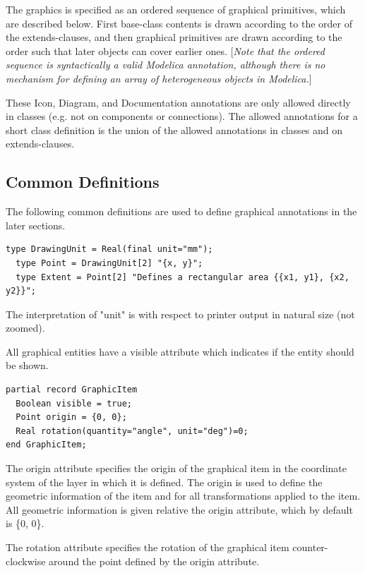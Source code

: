 \documentclass[10pt,a4paper]{report}
\def\doublelabel#1{\label{#1}}
\begin{document}
The graphics is specified as an ordered sequence of graphical
primitives, which are described below. First base-class contents is
drawn according to the order of the extends-clauses, and then graphical
primitives are drawn according to the order such that later objects can
cover earlier ones. {[}\emph{Note that the ordered sequence is
syntactically a valid Modelica annotation, although there is no
mechanism for defining an array of heterogeneous objects in
Modelica.}{]}

These Icon, Diagram, and Documentation annotations are only allowed
directly in classes (e.g. not on components or connections). The allowed
annotations for a short class definition is the union of the allowed
annotations in classes and on extends-clauses.

\subsection{Common Definitions}\doublelabel{common-definitions}

The following common definitions are used to define graphical
annotations in the later sections.

\begin{lstlisting}[language=modelica]
  type DrawingUnit = Real(final unit="mm");
  type Point = DrawingUnit[2] "{x, y}";
  type Extent = Point[2] "Defines a rectangular area {{x1, y1}, {x2, y2}}";
\end{lstlisting}
The interpretation of "unit" is with respect to printer output in
natural size (not zoomed).

All graphical entities have a visible attribute which indicates if the
entity should be shown.

\begin{lstlisting}[language=modelica]
partial record GraphicItem
  Boolean visible = true;
  Point origin = {0, 0};
  Real rotation(quantity="angle", unit="deg")=0;
end GraphicItem;
\end{lstlisting}
The origin attribute specifies the origin of the graphical item in the
coordinate system of the layer in which it is defined. The origin is
used to define the geometric information of the item and for all
transformations applied to the item. All geometric information is given
relative the origin attribute, which by default is \{0, 0\}.

The rotation attribute specifies the rotation of the graphical item
counter-clockwise around the point defined by the origin attribute.
\end{document}

